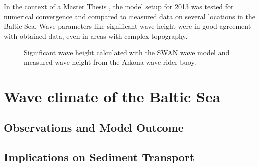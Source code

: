 In the context of a Master Thesis \citep[][]{masterarbeitronja}, the model setup for 2013 was tested for numerical convergence and compared to measured data on several locations in the Baltic Sea. Wave parameters like significant wave height were in good agreement with obtained data, even in areas with complex topography.

\begin{figure}[h]
 \caption{Significant wave height calculated with the SWAN wave model and measured wave height from the Arkona wave rider buoy.}
\end{figure}

\section{Wave climate of the Baltic Sea}	

\subsection{Observations and Model Outcome}

\subsection{Implications on Sediment Transport}
